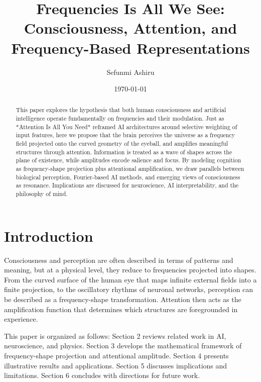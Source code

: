 \documentclass[12pt]{article}
\title{Frequencies Is All We See:\\
Consciousness, Attention, and Frequency-Based Representations}
\author{Sefunmi Ashiru}
\date{\today}
\begin{document}
\maketitle

\begin{abstract}
This paper explores the hypothesis that both human consciousness and artificial intelligence operate fundamentally on frequencies and their modulation. Just as *Attention Is All You Need* reframed AI architectures around selective weighting of input features, here we propose that the brain perceives the universe as a frequency field projected onto the curved geometry of the eyeball, and amplifies meaningful structures through attention. Information is treated as a wave of shapes across the plane of existence, while amplitudes encode salience and focus. By modeling cognition as frequency-shape projection plus attentional amplification, we draw parallels between biological perception, Fourier-based AI methods, and emerging views of consciousness as resonance. Implications are discussed for neuroscience, AI interpretability, and the philosophy of mind.
\end{abstract}

\newpage
\tableofcontents
\newpage

\section{Introduction}

Consciousness and perception are often described in terms of patterns and meaning, but at a physical level, they reduce to frequencies projected into shapes. From the curved surface of the human eye that maps infinite external fields into a finite projection, to the oscillatory rhythms of neuronal networks, perception can be described as a frequency-shape transformation. Attention then acts as the amplification function that determines which structures are foregrounded in experience.

This paper is organized as follows: Section 2 reviews related work in AI, neuroscience, and physics. Section 3 develops the mathematical framework of frequency-shape projection and attentional amplitude. Section 4 presents illustrative results and applications. Section 5 discusses implications and limitations. Section 6 concludes with directions for future work.
\end{document}
